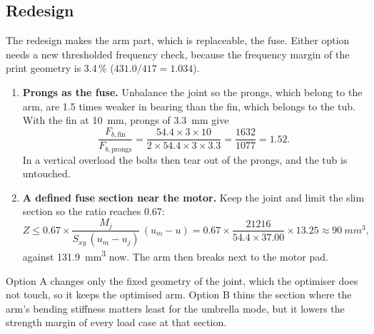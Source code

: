 \subsection{Redesign}

The redesign makes the arm part, which is replaceable, the fuse. Either option needs a new thresholded frequency check, because the frequency margin of the print geometry is 3.4\,\% ($431.0/417 = 1.034$).
\begin{enumerate}
\item[(A)] \textbf{Prongs as the fuse.} Unbalance the joint so the prongs, which belong to the arm, are 1.5 times weaker in bearing than the fin, which belongs to the tub. With the fin at \SI{10}{mm}, prongs of \SI{3.3}{mm} give
\begin{equation}
\frac{F_{b,\text{fin}}}{F_{b,\text{prongs}}} = \frac{54.4 \times 3 \times 10}{2 \times 54.4 \times 3 \times 3.3} = \frac{1632}{1077} = 1.52.
\end{equation}
In a vertical overload the bolts then tear out of the prongs, and the tub is untouched.
\item[(B)] \textbf{A defined fuse section near the motor.} Keep the joint and limit the slim section so the ratio reaches 0.67:
\begin{equation}
Z \leq 0.67 \times \frac{M_j}{S_{xy}\,(u_m - u_j)}\,(u_m - u) = 0.67 \times \frac{21216}{54.4 \times 37.00} \times 13.25 \approx \SI{90}{mm^3},
\end{equation}
against \SI{131.9}{mm^3} now. The arm then breaks next to the motor pad.
\end{enumerate}
Option A changes only the fixed geometry of the joint, which the optimiser does not touch, so it keeps the optimised arm. Option B thins the section where the arm's bending stiffness matters least for the umbrella mode, but it lowers the strength margin of every load case at that section.

